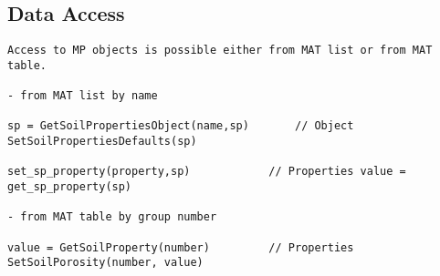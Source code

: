 
\subsection{Data Access}

\begin{verbatim}
Access to MP objects is possible either from MAT list or from MAT
table.

- from MAT list by name

sp = GetSoilPropertiesObject(name,sp)       // Object
SetSoilPropertiesDefaults(sp)

set_sp_property(property,sp)            // Properties value =
get_sp_property(sp)

- from MAT table by group number

value = GetSoilProperty(number)         // Properties
SetSoilPorosity(number, value)

\end{verbatim}

\newpage
